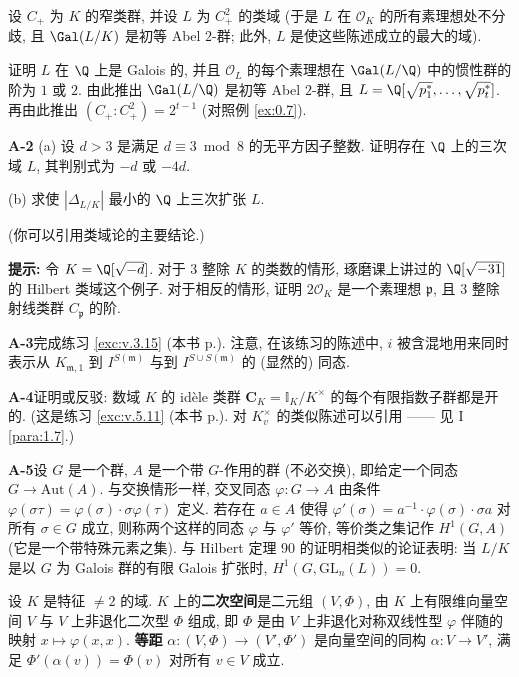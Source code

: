 设 $C_+$ 为 $K$ 的窄类群, 并设 $L$ 为 $C_+^{2}$ 的类域 (于是 $L$ 在 $\mathcal{O}_K$ 的所有素理想处不分歧, 且 $\Gal(L/K)$ 是初等 Abel $2$-群; 此外, $L$ 是使这些陈述成立的最大的域).

证明 $L$ 在 $\Q$ 上是 Galois 的, 并且 $\mathcal{O}_L$ 的每个素理想在 $\Gal(L/\Q)$ 中的惯性群的阶为 $1$ 或 $2$. 由此推出 $\Gal(L/\Q)$ 是初等 Abel $2$-群, 且 $L=\Q[\sqrt{p_1^{*}},\ldots,\sqrt{p_t^{*}}]$. 再由此推出 $(C_+:C_+^{2})=2^{t-1}$ (对照例 \ref{ex:0.7}).

\medskip\noindent\textbf{A-2}\quad
(a) 设 $d>3$ 是满足 $d\equiv 3 \bmod 8$ 的无平方因子整数. 证明存在 $\Q$ 上的三次域 $L$, 其判别式为 $-d$ 或 $-4d$.

(b) 求使 $|\Delta_{L/K}|$ 最小的 $\Q$ 上三次扩张 $L$.

(你可以引用类域论的主要结论.)

\textbf{提示:} 令 $K=\Q[\sqrt{-d}]$. 对于 $3$ 整除 $K$ 的类数的情形, 琢磨课上讲过的 $\Q[\sqrt{-31}]$ 的 Hilbert 类域这个例子. 对于相反的情形, 证明 $2\mathcal{O}_K$ 是一个素理想 $\mathfrak{p}$, 且 $3$ 整除射线类群 $C_{\mathfrak{p}}$ 的阶.

\medskip\noindent\textbf{A-3}\quad 完成练习 \ref{exc:v.3.15} (本书 p.\pageref{exc:v.3.15}). 注意, 在该练习的陈述中, $i$ 被含混地用来同时表示从 $K_{\mathfrak{m},1}$ 到 $I^{S(\mathfrak{m})}$ 与到 $I^{S\cup S(\mathfrak{m})}$ 的 (显然的) 同态.

\medskip\noindent\textbf{A-4}\quad 证明或反驳: 数域 $K$ 的 id\`ele 类群 $\mathbf{C}_K=\mathbb{I}_K/K^{\times}$ 的每个有限指数子群都是开的. (这是练习 \ref{exc:v.5.11} (本书 p.\pageref{exc:v.5.11}). 对 $K_v^{\times}$ 的类似陈述可以引用 —— 见 I \ref{para:1.7}.)

\medskip\noindent\textbf{A-5}\quad 设 $G$ 是一个群, $A$ 是一个带 $G$-作用的群 (不必交换), 即给定一个同态 $G\to\mathrm{Aut}(A)$. 与交换情形一样, 交叉同态 $\varphi\colon G\to A$ 由条件 $\varphi(\sigma\tau)=\varphi(\sigma)\cdot\sigma\varphi(\tau)$ 定义. 若存在 $a\in A$ 使得 $\varphi'(\sigma)=a^{-1}\cdot\varphi(\sigma)\cdot\sigma a$ 对所有 $\sigma\in G$ 成立, 则称两个这样的同态 $\varphi$ 与 $\varphi'$ 等价, 等价类之集记作 $H^{1}(G,A)$ (它是一个带特殊元素之集). 与 Hilbert 定理 90 的证明相类似的论证表明: 当 $L/K$ 是以 $G$ 为 Galois 群的有限 Galois 扩张时, $H^{1}(G,\mathrm{GL}_n(L))=0$.

设 $K$ 是特征 $\ne 2$ 的域. $K$ 上的\textbf{二次空间}是二元组 $(V,\Phi)$, 由 $K$ 上有限维向量空间 $V$ 与 $V$ 上非退化二次型 $\Phi$ 组成, 即 $\Phi$ 是由 $V$ 上非退化对称双线性型 $\varphi$ 伴随的映射 $x\mapsto\varphi(x,x)$. \textbf{等距} $\alpha\colon(V,\Phi)\to(V',\Phi')$ 是向量空间的同构 $\alpha\colon V\to V'$, 满足 $\Phi'(\alpha(v))=\Phi(v)$ 对所有 $v\in V$ 成立.

